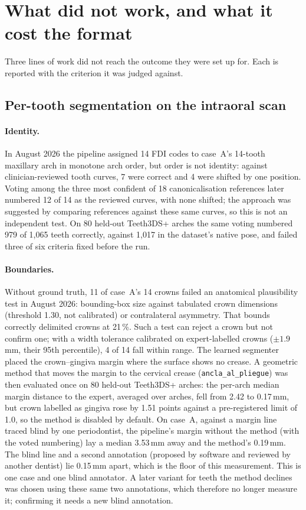 \documentclass[11pt,a4paper]{article}
\newcommand{\code}[1]{\texttt{\small #1}}
\begin{document}
\section{What did not work, and what it cost the format}\label{sec:negative}

Three lines of work did not reach the outcome they were set up for. Each is reported with
the criterion it was judged against.

\subsection{Per-tooth segmentation on the intraoral scan}

\paragraph{Identity.} In August 2026 the pipeline assigned 14 FDI codes to case~A's
14-tooth maxillary arch in monotone arch order, but order is not identity: against
clinician-reviewed tooth curves, 7 were correct and 4 were shifted by one position. Voting
among the three most confident of 18 canonicalisation references later numbered 12 of 14 as
the reviewed curves, with none shifted; the approach was suggested by comparing references
against these same curves, so this is not an independent test. On 80 held-out Teeth3DS+ arches \cite{teeth3ds} the
same voting numbered 979 of 1{,}065 teeth correctly, against 1{,}017 in the dataset's native
pose, and failed three of six criteria fixed before the run.

\paragraph{Boundaries.} Without ground truth, 11 of case~A's 14 crowns failed an anatomical
plausibility test in August 2026: bounding-box size against tabulated crown dimensions
(threshold 1.30, not calibrated) or contralateral asymmetry. That bounds correctly delimited
crowns at 21\,\%. Such a test can reject a crown but not confirm one; with a width tolerance
calibrated on expert-labelled crowns ($\pm1.9$\,mm, their 95th percentile), 4 of 14 fall
within range. The learned segmenter placed the crown--gingiva margin where the surface shows
no crease. A geometric method that moves the margin to the cervical crease
(\code{ancla\_al\_pliegue}) was then evaluated once on 80 held-out Teeth3DS+ arches: the
per-arch median margin distance to the expert, averaged over arches, fell from 2.42 to
0.17\,mm, but crown labelled as
gingiva rose by 1.51 points against a pre-registered limit of 1.0, so the method is disabled
by default. On case~A, against a margin line traced blind by one periodontist, the pipeline's
margin without the method (with the voted numbering) lay a median 3.53\,mm away and the method's 0.19\,mm. The blind line and a
second annotation (proposed by software and reviewed by another dentist) lie 0.15\,mm apart,
which is the floor of this measurement. This is one case and one blind annotator. A later variant
for teeth the method declines was chosen using these same two annotations, which therefore no
longer measure it; confirming it needs a new blind annotation.
\end{document}
